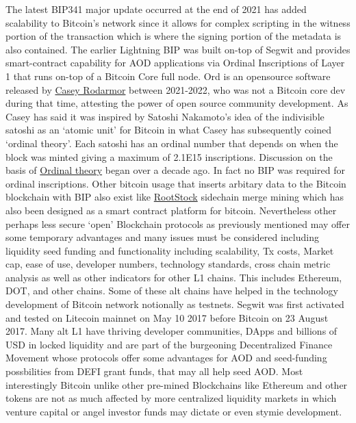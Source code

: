\documentclass[final,5p,times,twocolumn,authoryear]{elsarticle}
\begin{document}
The latest BIP341 major update occurred at the end of 2021 has added scalability to Bitcoin's network since it allows for complex scripting in the witness portion of the transaction which is where the signing portion of the metadata is also contained. The earlier Lightning BIP was built on-top of Segwit and provides smart-contract capability for AOD applications via Ordinal Inscriptions of Layer 1 that runs on-top of a Bitcoin Core full node. Ord is an opensource software released by \href{https://github.com/casey/ord}{Casey Rodarmor} between 2021-2022, who was not a Bitcoin core dev during that time, attesting the power of open source community development. As Casey has said it was inspired by Satoshi Nakamoto's idea of the indivisible satoshi as an `atomic unit' for Bitcoin in what Casey has subsequently coined `ordinal theory'. Each satoshi has an ordinal number that depends on when the block was minted giving a maximum of 2.1E15 inscriptions. Discussion on the basis of \href{https://bitcointalk.org/index.php?topic=117224.0}{Ordinal theory} began over a decade ago. In fact no BIP was required for ordinal inscriptions. Other bitcoin usage that inserts arbitary data to the Bitcoin blockchain with BIP also exist like \href{https://dev.rootstock.io/rsk/}{RootStock} sidechain merge mining which has also been designed as a smart contract platform for bitcoin. Nevertheless other perhaps less secure `open' Blockchain protocols as previously mentioned may offer some temporary advantages and many issues must be considered including liquidity seed funding and functionality including scalability, Tx costs, Market cap, ease of use, developer numbers, technology standards, cross chain metric analysis as well as other indicators for other L1 chains. This includes Ethereum, DOT, and other chains. Some of these alt chains have helped in the technology development of Bitcoin network notionally as testnets. Segwit was first activated and tested on Litecoin mainnet on May 10 2017 before Bitcoin on 23 August 2017. Many alt L1 have thriving developer communities, DApps and billions of USD in locked liquidity and are part of the burgeoning Decentralized Finance Movement whose protocols offer some advantages for AOD and seed-funding possbilities from DEFI grant funds, that may all help seed AOD. Most interestingly Bitcoin unlike other pre-mined Blockchains like Ethereum and other tokens are not as much affected by more centralized liquidity markets in which venture capital or angel investor funds may dictate or even stymie development. 
\end{document}

